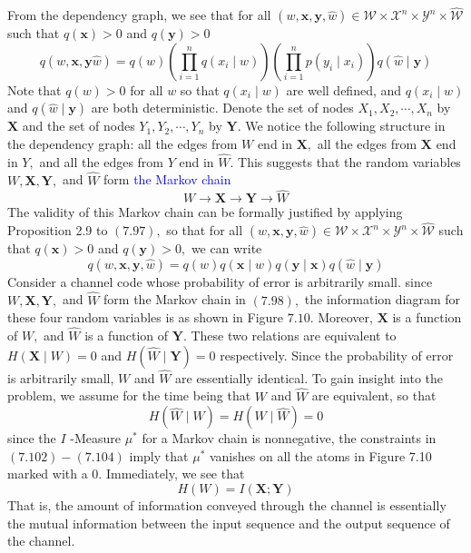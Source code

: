 \documentclass[8pt]{article}
\begin{document}
From the dependency graph, we see that for all $(w, \mathbf{x}, \mathbf{y}, \hat{w}) \in \mathcal{W} \times \mathcal{X}^{n} \times \mathcal{Y}^{n} \times \hat{\mathcal{W}}$
such that $q(\mathbf{x})>0$ and $q(\mathbf{y})>0$
$$
q(w, \mathbf{x}, \mathbf{y} \hat{w})=q(w)\left(\prod_{i=1}^{n} q\left(x_{i} \mid w\right)\right)\left(\prod_{i=1}^{n} p\left(y_{i} \mid x_{i}\right)\right) q(\hat{w} \mid \mathbf{y})
$$
Note that $q(w)>0$ for all $w$ so that $q\left(x_{i} \mid w\right)$ are well defined, and $q\left(x_{i} \mid w\right)$ and $q(\hat{w} \mid \mathbf{y})$ are both deterministic. Denote the set of nodes $X_{1}, X_{2}, \cdots, X_{n}$ by $\mathbf{X}$ and the set of nodes $Y_{1}, Y_{2}, \cdots, Y_{n}$ by $\mathbf{Y}$. We notice the following structure in the dependency graph: all the edges from $W$ end in $\mathbf{X},$ all the edges from $\mathbf{X}$ end in $Y,$ and all the edges from $Y$ end in $\hat{W} .$ This suggests that the random variables $W, \mathbf{X}, \mathbf{Y},$ and $\hat{W}$ form \textcolor{blue}{the Markov chain}
$$
W \rightarrow \mathbf{X} \rightarrow \mathbf{Y} \rightarrow \hat{W}
$$
The validity of this Markov chain can be formally justified by applying Proposition 2.9 to $(7.97),$ so that for all $(w, \mathbf{x}, \mathbf{y}, \hat{w}) \in \mathcal{W} \times \mathcal{X}^{n} \times \mathcal{Y}^{n} \times \hat{\mathcal{W}}$ such that
$q(\mathbf{x})>0$ and $q(\mathbf{y})>0,$ we can write
$$
q(w, \mathbf{x}, \mathbf{y}, \hat{w})=q(w) q(\mathbf{x} \mid w) q(\mathbf{y} \mid \mathbf{x}) q(\hat{w} \mid \mathbf{y})
$$
Consider a channel code whose probability of error is arbitrarily small. since $W, \mathbf{X}, \mathbf{Y},$ and $\hat{W}$ form the Markov chain in $(7.98),$ the information diagram for these four random variables is as shown in Figure $7.10 .$ Moreover, $\mathbf{X}$ is a function of $W,$ and $\hat{W}$ is a function of $\mathbf{Y} .$ These two relations are equivalent to
$H(\mathbf{X} \mid W)=0$ and $H(\hat{W} \mid \mathbf{Y})=0$
respectively. Since the probability of error is arbitrarily small, $W$ and $\hat{W}$ are essentially identical. To gain insight into the problem, we assume for the time being that $W$ and $\hat{W}$ are equivalent, so that
$$
H(\hat{W} \mid W)=H(W \mid \hat{W})=0
$$
since the $I$ -Measure $\mu^{*}$ for a Markov chain is nonnegative, the constraints in $(7.102)-(7.104)$ imply that $\mu^{*}$ vanishes on all the atoms in Figure 7.10 marked with a 0. Immediately, we see that
$$
H(W)=I(\mathbf{X} ; \mathbf{Y})
$$
That is, the amount of information conveyed through the channel is essentially the mutual information between the input sequence and the output sequence of the channel.
\end{document}
